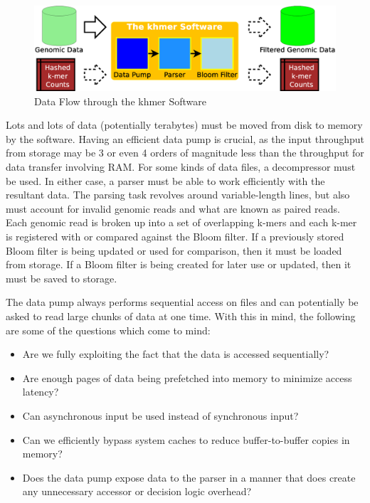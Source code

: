 \documentclass{article}
\begin{document}
\begin{figure}[ht!]
\centering
\includegraphics[scale=0.4]{data_flow.eps}
\caption{Data Flow through the khmer Software}
\label{khmerDataFlow}
\end{figure}

Lots and lots of data (potentially terabytes) must be moved from disk to memory by the software. Having an efficient data pump is crucial, as the input throughput from storage may be 3 or even 4 orders of magnitude less than the throughput for data transfer involving RAM. For some kinds of data files, a decompressor must be used. In either case, a parser must be able to work efficiently with the resultant data. The parsing task revolves around variable-length lines, but also must account for invalid genomic reads and what are known as paired reads. Each genomic read is broken up into a set of overlapping k-mers and each k-mer is registered with or compared against the Bloom filter. If a previously stored Bloom filter is being updated or used for comparison, then it must be loaded from storage. If a Bloom filter is being created for later use or updated, then it must be saved to storage.

The data pump always performs sequential access on files and can potentially be asked to read large chunks of data at one time. With this in mind, the following are some of the questions which come to mind:
\begin{itemize}
\item Are we fully exploiting the fact that the data is accessed sequentially?
\item Are enough pages of data being prefetched into memory to minimize access latency?
\item Can asynchronous input be used instead of synchronous input?
\item Can we efficiently bypass system caches to reduce buffer-to-buffer copies in memory?
\item Does the data pump expose data to the parser in a manner that does create any unnecessary accessor or decision logic overhead?
\end{itemize}
\end{document}
